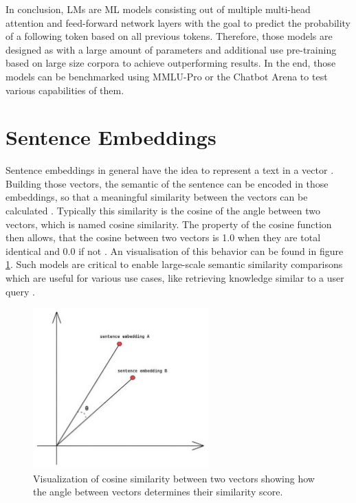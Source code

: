 \documentclass[a4paper,oneside,bibliography=totoc]{scrbook}
\begin{document}
In conclusion, \acp{LM} are \ac{ML} models consisting out of multiple multi-head attention and feed-forward network layers with the goal to predict the probability of a following token based on all previous tokens. Therefore, those models are designed as with a large amount of parameters and additional use pre-training based on large size corpora to achieve outperforming results. In the end, those models can be benchmarked using MMLU-Pro or the Chatbot Arena to test various capabilities of them.

\section{Sentence Embeddings}
\label{sec:sentence_embeddings}

Sentence embeddings in general have the idea to represent a text in a vector \cite{Singhal2001}. Building those vectors, the semantic of the sentence can be encoded in those embeddings, so that a meaningful similarity between the vectors can be calculated \cite{Reimers2019}. Typically this similarity is the cosine of the angle between two vectors, which is named cosine similarity. The property of the cosine function then allows, that the cosine between two vectors is 1.0 when they are total identical and 0.0 if not \cite{Singhal2001}. An visualisation of this behavior can be found in figure \ref{fig:cosine_similarity}. Such models are critical to enable large-scale semantic similarity comparisons which are useful for various use cases, like retrieving knowledge similar to a user query \cite{Reimers2019,Gao2024}.

\begin{figure}[t]
  \centering
  \includegraphics[width=0.6\textwidth]{figures/cosine_similarity.jpeg}
  \caption{Visualization of cosine similarity between two vectors showing how the angle between vectors determines their similarity score. \cite{Leys2022}}
  \label{fig:cosine_similarity}
\end{figure}
\end{document}
